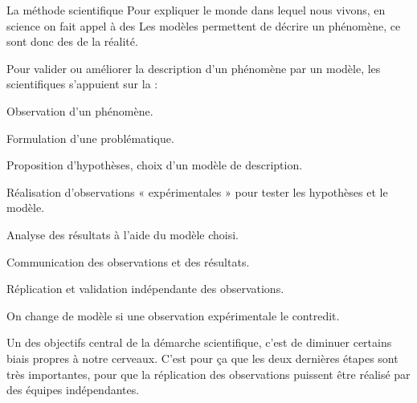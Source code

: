 \begin{doc}{La méthode scientifique}
  Pour expliquer le monde dans lequel nous vivons, en science on fait appel à des  
  Les modèles permettent de décrire un phénomène, ce sont donc des  de la réalité.

  Pour valider ou améliorer la description d'un phénomène par un modèle, les scientifiques s'appuient sur la  :
  \begin{enumeration}
    \item Observation d'un phénomène.
    \item Formulation d'une problématique.
    \item Proposition d'hypothèses, choix d'un modèle de description.
    \item Réalisation d'observations « expérimentales » pour tester les hypothèses et le modèle.
    \item Analyse des résultats à l'aide du modèle choisi.
    \item Communication des observations et des résultats.
    \item Réplication et validation indépendante des observations.
  \end{enumeration}

  \flecheLongue On change de modèle si une observation expérimentale le contredit.
  \bigskip

  Un des objectifs central de la démarche scientifique, c'est de diminuer certains biais propres à notre cerveaux.
  C'est pour ça que les deux dernières étapes sont très importantes, pour que la réplication des observations puissent être réalisé par des équipes indépendantes.
\end{doc}


